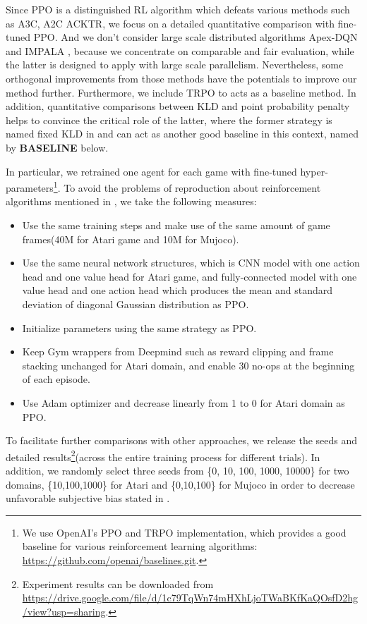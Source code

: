 \documentclass{article}
\begin{document}
Since PPO is  a distinguished RL algorithm which defeats various methods such as A3C, A2C ACKTR, we focus on a detailed quantitative comparison with fine-tuned PPO. And we don't consider large scale distributed algorithms Apex-DQN \cite{horgan2018distributed} and IMPALA \cite{espeholt2018impala}, because we concentrate on comparable and fair evaluation, while the latter is designed to apply with large scale parallelism. Nevertheless, some orthogonal improvements from those methods have the potentials to  improve our method further. Furthermore, we include TRPO to acts as a baseline method. In addition, quantitative comparisons between KLD and  point probability penalty helps to convince the critical role of the latter, where the former strategy is named fixed KLD in \cite{2017arXiv170706347S} and can act as another good baseline in this context, named by \textbf{BASELINE} below.

In particular, we retrained one agent for each game with fine-tuned hyper-parameters\footnote{
	We use OpenAI's PPO and TRPO implementation, which provides a good baseline for various reinforcement learning algorithms: \url{https://github.com/openai/baselines.git}.}. 
To avoid the problems of reproduction about reinforcement algorithms mentioned in \cite{henderson2017deep}, we take the following measures:

\begin{itemize}
	\item Use the same training steps and make use of the same amount of game frames(40M for Atari game and 10M for Mujoco)\@.
	\item Use the same neural network structures, which is CNN model with one action head and one value head for Atari game, and fully-connected model with one value head and one action head which produces the mean and standard deviation of diagonal Gaussian distribution as PPO\@. 
	\item Initialize  parameters using the  same strategy as PPO\@.
	\item Keep Gym wrappers from  Deepmind such as reward clipping and frame stacking unchanged for Atari domain, and enable 30 no-ops at the beginning of each episode\@.
	\item Use Adam optimizer \cite{kingma2014adam} and decrease   linearly from 1 to 0 for Atari domain as PPO\@.
\end{itemize}

To facilitate further comparisons with other approaches,  we release the seeds and  detailed results\footnote{Experiment results can be downloaded from \url{https://drive.google.com/file/d/1c79TqWn74mHXhLjoTWaBKfKaQOsfD2hg/view?usp=sharing}.}(across the entire training process for different trials). In addition, we randomly select three seeds from \{0, 10, 100, 1000, 10000\} for two domains, \{10,100,1000\} for Atari and \{0,10,100\} for Mujoco in order to decrease unfavorable subjective bias stated in \cite{henderson2017deep}.
\end{document}
